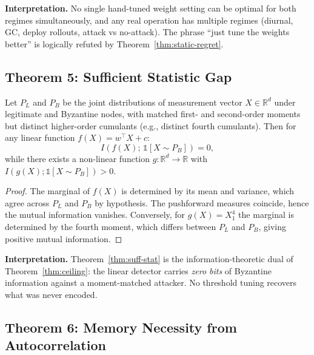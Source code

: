 \textbf{Interpretation.} No single hand-tuned weight setting can be
optimal for both regimes simultaneously, and any real operation has
multiple regimes (diurnal, GC, deploy rollouts, attack vs no-attack).
The phrase ``just tune the weights better'' is logically refuted by
Theorem~\ref{thm:static-regret}.

\subsection{Theorem 5: Sufficient Statistic Gap}

\begin{theorem}
\label{thm:suff-stat}
Let $P_L$ and $P_B$ be the joint distributions of measurement vector
$X \in \mathbb{R}^d$ under legitimate and Byzantine nodes, with matched
first- and second-order moments but distinct higher-order cumulants
(e.g., distinct fourth cumulants). Then for any linear function
$f(X) = w^\top X + c$:
\begin{equation}
  I\!\left(f(X);\, \mathbb{1}[X \sim P_B]\right) = 0,
\end{equation}
while there exists a non-linear function $g : \mathbb{R}^d \to \mathbb{R}$
with $I(g(X); \mathbb{1}[X \sim P_B]) > 0$.
\end{theorem}

\begin{proof}
The marginal of $f(X)$ is determined by its mean and variance, which
agree across $P_L$ and $P_B$ by hypothesis. The pushforward measures
coincide, hence the mutual information vanishes. Conversely, for
$g(X) = X_1^4$ the marginal is determined by the fourth moment, which
differs between $P_L$ and $P_B$, giving positive mutual information.
\end{proof}

\textbf{Interpretation.} Theorem~\ref{thm:suff-stat} is the
information-theoretic dual of Theorem~\ref{thm:ceiling}: the linear
detector carries \emph{zero bits} of Byzantine information against a
moment-matched attacker. No threshold tuning recovers what was never
encoded.

\subsection{Theorem 6: Memory Necessity from Autocorrelation}

